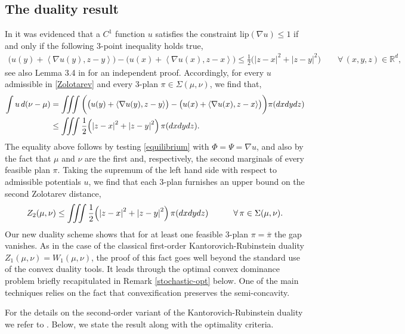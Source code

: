 \documentclass[11pt,reqno]{amsart}
\theoremstyle{definition}
\numberwithin{equation}{section}
\newcommand{\R}{\mathbb{R}}
\newcommand{\Rd}{{\R^d}}
\newcommand{\ov}{\overline}
\newcommand{\pairing}[1]{{\left \langle #1 \right \rangle}}
\newcommand{\abs}[1]{{\left \lvert #1 \right \rvert}}
\begin{document}
 \subsection{The duality result}
 In \cite{legruyer2009} it was evidenced that a $C^1$ function $u$ satisfies the constraint $\mathrm{lip}(\nabla u) \leq 1$ if and only if the following 3-point inequality holds true,
\begin{align}
	\label{3-point_ineq}
	\big({u}(y)+ \pairing{\nabla {u}(y),z-y}\big) -  \big({u}(x)  +  \pairing{\nabla {u}(x),z-x} \big) \leq \frac{1}{2} \Big( \abs{z-x}^2 + \abs{z-y}^2\Big)  \qquad 
	\forall\,(x,y,z) \in \Rd,
\end{align}
see also Lemma 3.4 in \cite{bolbou2024} for an independent proof. Accordingly, 
for every $u$ admissible in \eqref{Zolotarev} and every  3-plan $\pi \in \Sigma(\mu,\nu)$, we find that,
\begin{align}
	\nonumber
	\int u \,d(\nu-\mu) &= \iiint \bigg(	\big({u}(y)+ \pairing{\nabla {u}(y),z-y}\big) -  \big({u}(x)  +  \pairing{\nabla {u}(x),z-x} \big)  \bigg) \pi(dxdydz) \\
	\label{chain}
	& \leq \iiint \frac{1}{2} \Bigl( \abs{z-x}^2 + \abs{z-y}^2 \Bigr) \, \pi(dxdydz).
\end{align}
The equality above follows by testing \eqref{equilibrium} with $\Phi = \Psi = \nabla u$, and also by the fact that  $\mu$ and $\nu$ are the first and, respectively, the second marginals of every feasible plan $\pi$. Taking the supremum of the left hand side with respect to admissible potentials $u$, we find that each 3-plan furnishes an upper bound on the second Zolotarev distance,
\begin{align*}
	 Z_2(\mu,\nu) \leq  \iiint \frac{1}{2} \Bigl( \abs{z-x}^2 + \abs{z-y}^2 \Bigr) \, \pi(dxdydz)  \qquad\quad \forall\, \pi\in \Sigma(\mu,\nu).
\end{align*}
Our new duality scheme \cite{bolbou2024}  shows that for at least one feasible 3-plan $\pi = \ov\pi$ the gap vanishes. As in the case of the classical first-order Kantorovich-Rubinstein duality $Z_1(\mu,\nu) = W_1(\mu,\nu)$, the proof of this fact goes well beyond the standard use of the convex duality tools. It leads through the optimal convex dominance problem briefly recapitulated in Remark \ref{stochastic-opt} below. One of the main techniques relies on the fact that convexification  preserves the semi-concavity.

For the details on the second-order variant of the Kantorovich-Rubinstein duality we refer to \cite{bolbou2024}. Below, we state the result along with the optimality criteria.
\end{document}
